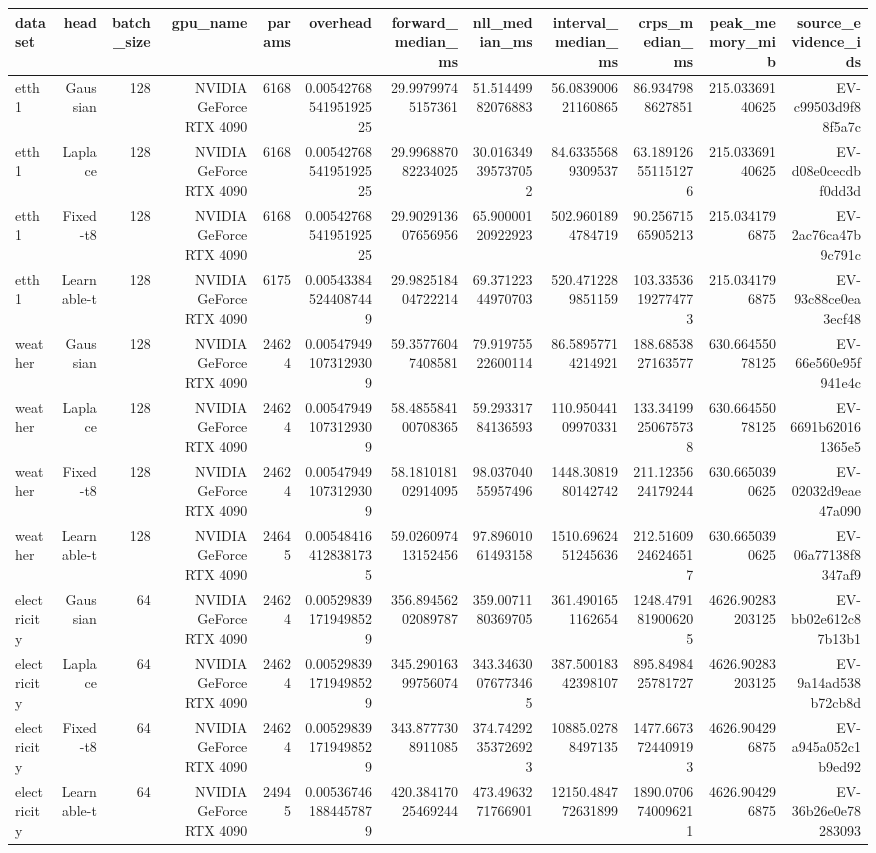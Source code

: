 \begin{tabular}{lrrrrrrrrrrr}
\toprule
dataset & head & batch\_size & gpu\_name & params & overhead & forward\_median\_ms & nll\_median\_ms & interval\_median\_ms & crps\_median\_ms & peak\_memory\_mib & source\_evidence\_ids \\
\midrule
etth1 & Gaussian & 128 & NVIDIA GeForce RTX 4090 & 6168 & 0.0054276854195192525 & 29.99799745157361 & 51.51449982076883 & 56.083900621160865 & 86.9347988627851 & 215.03369140625 & EV-c99503d9f88f5a7c \\
etth1 & Laplace & 128 & NVIDIA GeForce RTX 4090 & 6168 & 0.0054276854195192525 & 29.996887082234025 & 30.016349395737052 & 84.63355689309537 & 63.189126551151276 & 215.03369140625 & EV-d08e0cecdbf0dd3d \\
etth1 & Fixed-t8 & 128 & NVIDIA GeForce RTX 4090 & 6168 & 0.0054276854195192525 & 29.902913607656956 & 65.90000120922923 & 502.9601894784719 & 90.25671565905213 & 215.0341796875 & EV-2ac76ca47b9c791c \\
etth1 & Learnable-t & 128 & NVIDIA GeForce RTX 4090 & 6175 & 0.005433845244087449 & 29.982518404722214 & 69.37122344970703 & 520.4712289851159 & 103.33536192774773 & 215.0341796875 & EV-93c88ce0ea3ecf48 \\
weather & Gaussian & 128 & NVIDIA GeForce RTX 4090 & 24624 & 0.005479491073129309 & 59.35776047408581 & 79.91975522600114 & 86.58957714214921 & 188.6853827163577 & 630.66455078125 & EV-66e560e95f941e4c \\
weather & Laplace & 128 & NVIDIA GeForce RTX 4090 & 24624 & 0.005479491073129309 & 58.485584100708365 & 59.29331784136593 & 110.95044109970331 & 133.34199250675738 & 630.66455078125 & EV-6691b620161365e5 \\
weather & Fixed-t8 & 128 & NVIDIA GeForce RTX 4090 & 24624 & 0.005479491073129309 & 58.181018102914095 & 98.03704055957496 & 1448.3081980142742 & 211.1235624179244 & 630.6650390625 & EV-02032d9eae47a090 \\
weather & Learnable-t & 128 & NVIDIA GeForce RTX 4090 & 24645 & 0.005484164128381735 & 59.026097413152456 & 97.89601061493158 & 1510.6962451245636 & 212.51609246246517 & 630.6650390625 & EV-06a77138f8347af9 \\
electricity & Gaussian & 64 & NVIDIA GeForce RTX 4090 & 24624 & 0.005298391719498529 & 356.89456202089787 & 359.0071180369705 & 361.4901651162654 & 1248.4791819006205 & 4626.90283203125 & EV-bb02e612c87b13b1 \\
electricity & Laplace & 64 & NVIDIA GeForce RTX 4090 & 24624 & 0.005298391719498529 & 345.29016399756074 & 343.34630076773465 & 387.50018342398107 & 895.8498425781727 & 4626.90283203125 & EV-9a14ad538b72cb8d \\
electricity & Fixed-t8 & 64 & NVIDIA GeForce RTX 4090 & 24624 & 0.005298391719498529 & 343.8777308911085 & 374.74292353726923 & 10885.02788497135 & 1477.6673724409193 & 4626.904296875 & EV-a945a052c1b9ed92 \\
electricity & Learnable-t & 64 & NVIDIA GeForce RTX 4090 & 24945 & 0.005367461884457879 & 420.38417025469244 & 473.4963271766901 & 12150.484772631899 & 1890.0706740096211 & 4626.904296875 & EV-36b26e0e78283093 \\
\bottomrule
\end{tabular}

